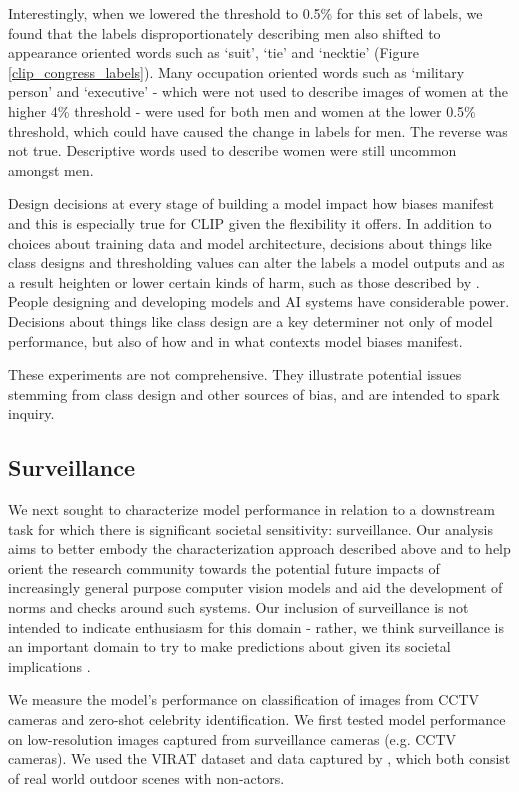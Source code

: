 \documentclass{article}
\begin{document}
Interestingly, when we lowered the threshold to 0.5\% for this set of labels, we found that the labels disproportionately describing men also shifted to appearance oriented words such as ‘suit’, ‘tie’ and ‘necktie’ (Figure \ref{clip_congress_labels}). Many occupation oriented words such as ‘military person’ and ‘executive’ - which were not used to describe images of women at the higher 4\% threshold - were used for both men and women at the lower 0.5\% threshold, which could have caused the change in labels for men. The reverse was not true. Descriptive words used to describe women were still uncommon amongst men.

Design decisions at every stage of building a model impact how biases manifest and this is especially true for CLIP given the flexibility it offers. In addition to choices about training data and model architecture, decisions about things like class designs and thresholding values can alter the labels a model outputs and as a result heighten or lower certain kinds of harm, such as those described by \citet{Crawford2017}. People designing and developing models and AI systems  have considerable power. Decisions about things like class design are a key determiner not only of model performance, but also of how and in what contexts model biases manifest.

These experiments are not comprehensive. They illustrate potential issues stemming from class design and other sources of bias, and are intended to spark inquiry.

\subsection{Surveillance}
We next sought to characterize model performance in relation to a downstream task for which there is significant societal sensitivity: surveillance. Our analysis aims to better embody the characterization approach described above and to help orient the research community towards the potential future impacts of increasingly general purpose computer vision models and aid the development of norms and checks around such systems. Our inclusion of surveillance is not intended to indicate enthusiasm for this domain - rather, we think surveillance is an important domain to try to make predictions about given its societal implications \citep{zuboff2015big,brownesurveillance}. 

We measure the model’s performance on classification of images from CCTV cameras and zero-shot celebrity identification. We first tested model performance on low-resolution images captured from surveillance cameras (e.g. CCTV cameras). We used the VIRAT dataset \citep{oh2011large} and data captured by \citet{varadarajan2009topic}, which both consist of real world outdoor scenes with non-actors.
\end{document}
